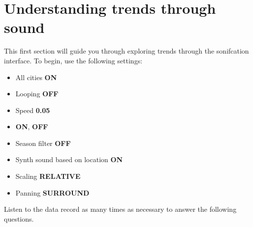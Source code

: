 \documentclass[12pt]{exam}
\begin{document}
\newcommand{\instructions}[1]{%
\vspace{1in}%
\begin{EnvUplevel}
#1
\end{EnvUplevel}
}


\section*{Understanding trends through sound}

\noindent This first section will guide you through exploring  trends through the sonifcation interface. To begin, use the following settings:
\begin{itemize}[noitemsep]
\item All cities \textbf{ON}
\item Looping \textbf{OFF}
\item Speed \textbf{0.05}
\item {} \textbf{ON},  \textbf{OFF}
\item Season filter \textbf{OFF}
\item Synth sound based on location \textbf{ON}
\item Scaling \textbf{RELATIVE}
\item Panning \textbf{SURROUND}
\end{itemize}

\noindent Listen to the data record as many times as necessary to answer the following questions.
\end{document}
